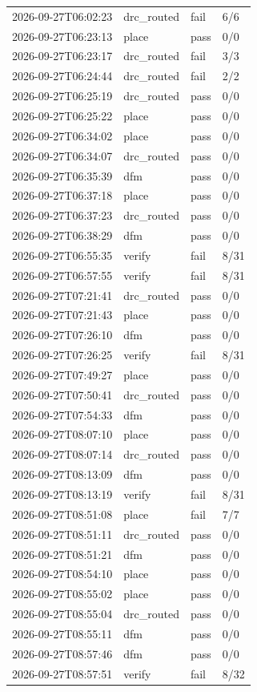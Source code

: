 \documentclass[11pt,a4paper]{article}
\begin{document}
{\begin{longtable}{llll}
2026-09-27T06:02:23 & drc\_routed & fail & 6/6 \\
2026-09-27T06:23:13 & place & pass & 0/0 \\
2026-09-27T06:23:17 & drc\_routed & fail & 3/3 \\
2026-09-27T06:24:44 & drc\_routed & fail & 2/2 \\
2026-09-27T06:25:19 & drc\_routed & pass & 0/0 \\
2026-09-27T06:25:22 & place & pass & 0/0 \\
2026-09-27T06:34:02 & place & pass & 0/0 \\
2026-09-27T06:34:07 & drc\_routed & pass & 0/0 \\
2026-09-27T06:35:39 & dfm & pass & 0/0 \\
2026-09-27T06:37:18 & place & pass & 0/0 \\
2026-09-27T06:37:23 & drc\_routed & pass & 0/0 \\
2026-09-27T06:38:29 & dfm & pass & 0/0 \\
2026-09-27T06:55:35 & verify & fail & 8/31 \\
2026-09-27T06:57:55 & verify & fail & 8/31 \\
2026-09-27T07:21:41 & drc\_routed & pass & 0/0 \\
2026-09-27T07:21:43 & place & pass & 0/0 \\
2026-09-27T07:26:10 & dfm & pass & 0/0 \\
2026-09-27T07:26:25 & verify & fail & 8/31 \\
2026-09-27T07:49:27 & place & pass & 0/0 \\
2026-09-27T07:50:41 & drc\_routed & pass & 0/0 \\
2026-09-27T07:54:33 & dfm & pass & 0/0 \\
2026-09-27T08:07:10 & place & pass & 0/0 \\
2026-09-27T08:07:14 & drc\_routed & pass & 0/0 \\
2026-09-27T08:13:09 & dfm & pass & 0/0 \\
2026-09-27T08:13:19 & verify & fail & 8/31 \\
2026-09-27T08:51:08 & place & fail & 7/7 \\
2026-09-27T08:51:11 & drc\_routed & pass & 0/0 \\
2026-09-27T08:51:21 & dfm & pass & 0/0 \\
2026-09-27T08:54:10 & place & pass & 0/0 \\
2026-09-27T08:55:02 & place & pass & 0/0 \\
2026-09-27T08:55:04 & drc\_routed & pass & 0/0 \\
2026-09-27T08:55:11 & dfm & pass & 0/0 \\
2026-09-27T08:57:46 & dfm & pass & 0/0 \\
2026-09-27T08:57:51 & verify & fail & 8/32 \\
\bottomrule
\end{longtable}
}
\end{document}
